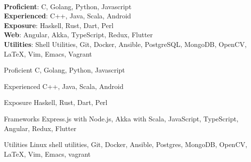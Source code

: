 \ifdefined\ONEPAGE
\\
\textbf{Proficient}: C, Golang, Python, Javascript\\
\textbf{Experienced}: C++, Java, Scala, Android\\
\textbf{Exposure}: Haskell, Rust, Dart, Perl\\
\textbf{Web}: Angular, Akka, TypeScript, Redux, Flutter\\
\textbf{Utilities}: Shell Utilities, Git, Docker, Ansible, PostgreSQL, MongoDB, OpenCV,
\LaTeX, Vim, Emacs, Vagrant

\else
\begin{cvskills}

  \cvskill
  {Proficient}
  {C, Golang, Python, Javascript}

  \cvskill
  {Experienced}
  {C++, Java, Scala, Android}
  
  \cvskill
  {Exposure}
  {Haskell, Rust, Dart, Perl}
  
  \cvskill
  {Frameworks}
  {Express.js with Node.js, Akka with Scala, JavaScript, TypeScript, Angular,
    Redux, Flutter}

  \cvskill
  {Utilities}
  {Linux shell utilities, Git, Docker, Ansible, Postgres,
    MongoDB, OpenCV, \LaTeX, Vim, Emacs, vagrant}

\end{cvskills}
\fi
